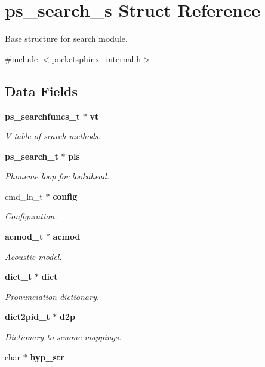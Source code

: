 \section{ps\+\_\+search\+\_\+s Struct Reference}
\label{structps__search__s}


Base structure for search module.  




{\ttfamily \#include $<$pocketsphinx\+\_\+internal.\+h$>$}

\subsection*{Data Fields}
\begin{DoxyCompactItemize}
\item 
{\bf ps\+\_\+searchfuncs\+\_\+t} $\ast$ {\bf vt}
\begin{DoxyCompactList}\small\item\em V-\/table of search methods. \end{DoxyCompactList}\item 
{\bf ps\+\_\+search\+\_\+t} $\ast$ {\bf pls}
\begin{DoxyCompactList}\small\item\em Phoneme loop for lookahead. \end{DoxyCompactList}\item 
cmd\+\_\+ln\+\_\+t $\ast$ {\bf config}
\begin{DoxyCompactList}\small\item\em Configuration. \end{DoxyCompactList}\item 
{\bf acmod\+\_\+t} $\ast$ {\bf acmod}
\begin{DoxyCompactList}\small\item\em Acoustic model. \end{DoxyCompactList}\item 
{\bf dict\+\_\+t} $\ast$ {\bf dict}
\begin{DoxyCompactList}\small\item\em Pronunciation dictionary. \end{DoxyCompactList}\item 
{\bf dict2pid\+\_\+t} $\ast$ {\bf d2p}
\begin{DoxyCompactList}\small\item\em Dictionary to senone mappings. \end{DoxyCompactList}\item 
char $\ast$ {\bf hyp\+\_\+str}

\end{DoxyCompactItemize}
